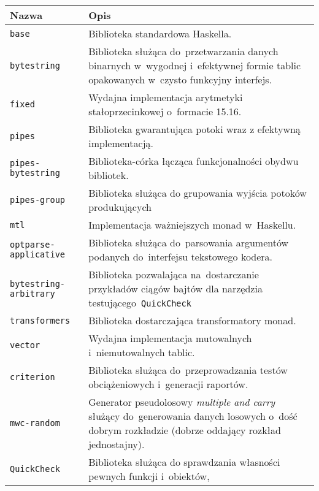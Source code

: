 \documentclass[../../praca.tex]{subfiles}
\begin{document}
\begin{table}[p]
  \centering
  \begin{tabular}{|l|p{8cm}|}
    \hline
    Nazwa & Opis \\ \hline
    \texttt{base}               & Biblioteka standardowa Haskella. \\ \hline
    \texttt{bytestring}         & Biblioteka służąca do~przetwarzania danych
                                  binarnych w~wygodnej i~efektywnej formie
                                  tablic opakowanych w~czysto funkcyjny interfejs. \\ \hline
    \texttt{fixed}              & Wydajna implementacja arytmetyki stałoprzecinkowej o~formacie 15.16. \\ \hline
    \texttt{pipes}              & Biblioteka gwarantująca potoki wraz z efektywną implementacją. \\ \hline
    \texttt{pipes-bytestring}   & Biblioteka-córka łącząca funkcjonalności obydwu bibliotek. \\ \hline
    \texttt{pipes-group}        & Biblioteka służąca do grupowania wyjścia potoków produkujących \\ \hline
    \texttt{mtl}                & Implementacja ważniejszych monad w~Haskellu. \\ \hline
    \texttt{optparse-applicative}&Biblioteka służąca do~parsowania argumentów podanych 
                                  do~interfejsu tekstowego kodera. \\ \hline
    \texttt{bytestring-arbitrary}&Biblioteka pozwalająca na~dostarczanie przykładów ciągów bajtów
                                  dla narzędzia testującego~\texttt{QuickCheck} \\ \hline
    \texttt{transformers}       & Biblioteka dostarczająca transformatory monad. \\ \hline
    \texttt{vector}             & Wydajna implementacja mutowalnych i~niemutowalnych tablic. \\ \hline
    \hline
    \texttt{criterion}          & Biblioteka służąca do~przeprowadzania testów obciążeniowych
                                  i~generacji raportów. \\ \hline
    \texttt{mwc-random}         & Generator pseudolosowy \emph{multiple and carry} służący 
                                  do~generowania danych losowych o~dość dobrym rozkładzie
                                  (dobrze oddający rozkład jednostajny). \\ \hline
    \texttt{QuickCheck}         & Biblioteka służąca do sprawdzania własności pewnych funkcji i~obiektów,

\end{tabular}
\end{table}
\end{document}
